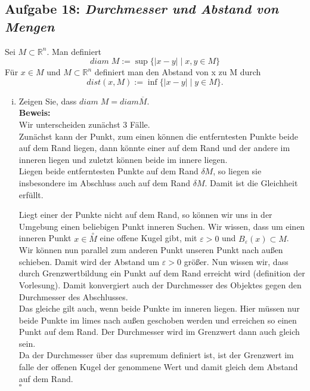 \documentclass[11pt,a4paper,ngerman]{article}
\begin{document}
\subsection*{Aufgabe 18: \mdseries\itshape Durchmesser und Abstand von Mengen}
	Sei $M \subset \mathbb{R}^n$. Man definiert
	$$
		diam \; M := \sup \{ |x-y| \; | \; x,y \in M \}
	$$
	Für $x \in M$ und $M \subset \mathbb{R}^n$ definiert man den Abstand von x zu M durch
	$$
		dist (x,M) := \inf \{|x-y| \; | \; y \in M \}.
	$$
	\begin{enumerate}[(i)]
		\item Zeigen Sie, dass $diam \; M = diam \overline{M}$.\\
		\textbf{Beweis:}\\
			Wir unterscheiden zunächst 3 Fälle.\\
            Zunächst kann der Punkt, zum einen können die entferntesten Punkte
            beide auf dem Rand liegen, dann könnte einer auf dem Rand und der andere
            im inneren liegen und zuletzt können beide im innere liegen.\\

            Liegen beide entferntesten Punkte auf dem Rand $\delta M$, so liegen
            sie insbesondere im Abschluss auch auf dem Rand $\delta M$. Damit ist
            die Gleichheit erfüllt.

            Liegt einer der Punkte nicht auf dem Rand, so können wir uns in der Umgebung
            einen beliebigen Punkt inneren Suchen. Wir wissen, dass um einen inneren Punkt
            $x \in \overset{\circ}{M}$ eine offene Kugel gibt, mit $\varepsilon > 0$ und
            $B_\varepsilon ( x ) \subset M$. Wir können nun parallel zum anderen Punkt
            unseren Punkt nach außen schieben. Damit wird der Abstand um $\varepsilon > 0$
            größer. Nun wissen wir, dass durch Grenzwertbildung ein Punkt auf dem Rand
            erreicht wird (definition der Vorlesung). Damit konvergiert auch
            der Durchmesser des Objektes gegen den Durchmesser des Abschlusses.\\

            Das gleiche gilt auch, wenn beide Punkte im inneren liegen. Hier müssen
            nur beide Punkte im limes nach außen geschoben werden und erreichen so
            einen Punkt auf dem Rand. Der Durchmesser wird im Grenzwert dann auch gleich sein.\\

            Da der Durchmesser über das supremum definiert ist, ist der Grenzwert im
            falle der offenen Kugel der genommene Wert und damit gleich dem Abstand auf dem Rand.\\
            \mbox{}\hfill $\square$


\end{enumerate}
\end{document}
